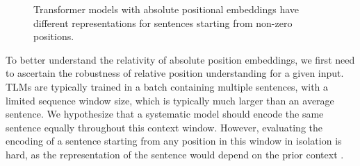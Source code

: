 \documentclass[letterpaper, 12pt]{report}
\begin{document}
\begin{figure}
    \centering
    \caption{Transformer models with absolute positional embeddings have different representations for sentences starting from non-zero positions. }
    \label{fig:bert_confused}
\end{figure}

To better understand the relativity of absolute position embeddings, we first need to ascertain the robustness of relative position understanding for a given input.
TLMs are typically trained in a batch containing multiple sentences, with a limited sequence window size, which is typically much larger than an average sentence.
We hypothesize that a systematic model should encode the same sentence equally throughout this context window.
However, evaluating the encoding of a sentence starting from any position in this window in isolation is hard, as the representation of the sentence would depend on the prior context \cite{misra2020exploring,kassner-schutze-2020-negated}.
\end{document}
